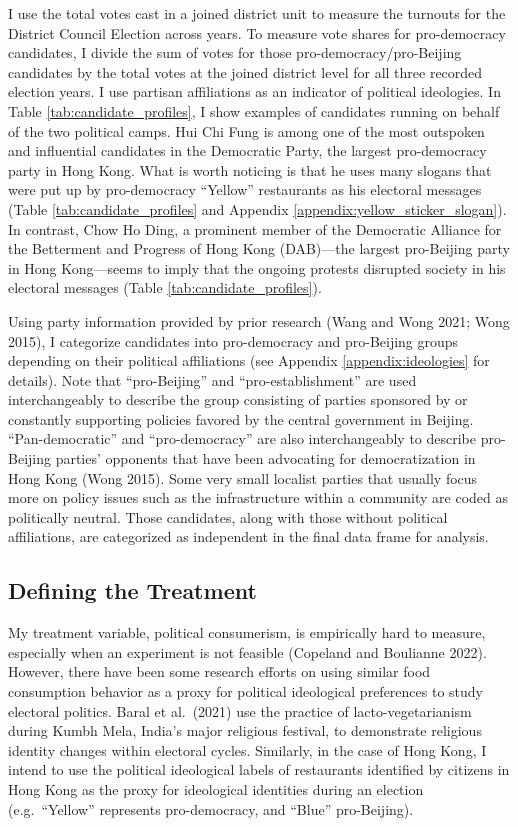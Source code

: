 \documentclass[letterpaper, 12pt]{article}
\begin{document}
I use the total votes cast in a joined district unit to measure the turnouts for the District Council Election across years. To measure vote shares for pro-democracy candidates, I divide the sum of votes for those pro-democracy/pro-Beijing candidates by the total votes at the joined district level for all three recorded election years. I use partisan affiliations as an indicator of political ideologies. In Table \ref{tab:candidate_profiles}, I show examples of candidates running on behalf of the two political camps. Hui Chi Fung is among one of the most outspoken and influential candidates in the Democratic Party, the largest pro-democracy party in Hong Kong. What is worth noticing is that he uses many slogans that were put up by pro-democracy ``Yellow'' restaurants as his electoral messages (Table \ref{tab:candidate_profiles} and Appendix \ref{appendix:yellow_sticker_slogan}). In contrast, Chow Ho Ding, a prominent member of the Democratic Alliance for the Betterment and Progress of Hong Kong (DAB)---the largest pro-Beijing party in Hong Kong---seems to imply that the ongoing protests disrupted society in his electoral messages (Table \ref{tab:candidate_profiles}).

Using party information provided by prior research (Wang and Wong 2021; Wong 2015), I categorize candidates into pro-democracy and pro-Beijing groups depending on their political affiliations (see Appendix \ref{appendix:ideologies} for details). Note that ``pro-Beijing'' and ``pro-establishment'' are used interchangeably to describe the group consisting of parties sponsored by or constantly supporting policies favored by the central government in Beijing. ``Pan-democratic'' and ``pro-democracy'' are also interchangeably to describe pro-Beijing parties' opponents that have been advocating for democratization in Hong Kong (Wong 2015). Some very small localist parties that usually focus more on policy issues such as the infrastructure within a community are coded as politically neutral. Those candidates, along with those without political affiliations, are categorized as independent in the final data frame for analysis. 




\subsection{Defining the Treatment}
My treatment variable, political consumerism, is empirically hard to measure, especially when an experiment is not feasible (Copeland and Boulianne 2022). However, there have been some research efforts on using similar food consumption behavior as a proxy for political ideological preferences to study electoral politics. Baral et al.\ (2021) use the practice of lacto-vegetarianism during Kumbh Mela, India's major religious festival, to demonstrate religious identity changes within electoral cycles. Similarly, in the case of Hong Kong, I intend to use the political ideological labels of restaurants identified by citizens in Hong Kong as the proxy for ideological identities during an election (e.g.\ ``Yellow'' represents pro-democracy, and ``Blue'' pro-Beijing). 
\end{document}
